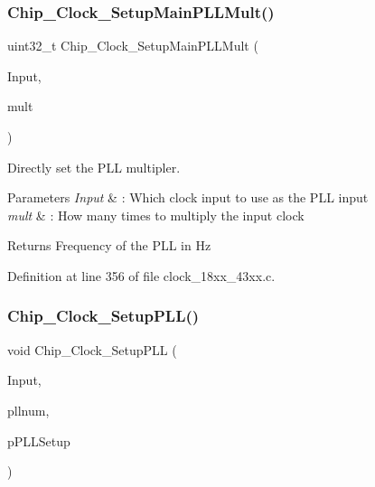 \subsubsection{\texorpdfstring{Chip\+\_\+\+Clock\+\_\+\+Setup\+Main\+P\+L\+L\+Mult()}{Chip\_Clock\_SetupMainPLLMult()}}
{\footnotesize\ttfamily uint32\+\_\+t Chip\+\_\+\+Clock\+\_\+\+Setup\+Main\+P\+L\+L\+Mult (\begin{DoxyParamCaption}\item[{\hyperlink{group___c_l_o_c_k__18_x_x__43_x_x_ga0975326707efebf2b074283e6c602f18}{C\+H\+I\+P\+\_\+\+C\+G\+U\+\_\+\+C\+L\+K\+I\+N\+\_\+T}}]{Input,  }\item[{uint32\+\_\+t}]{mult }\end{DoxyParamCaption})}



Directly set the P\+LL multipler. 


\begin{DoxyParams}{Parameters}
{\em Input} & \+: Which clock input to use as the P\+LL input \\
\hline
{\em mult} & \+: How many times to multiply the input clock \\
\hline
\end{DoxyParams}
\begin{DoxyReturn}{Returns}
Frequency of the P\+LL in Hz 
\end{DoxyReturn}


Definition at line 356 of file clock\+\_\+18xx\+\_\+43xx.\+c.

\mbox{\label{group___c_l_o_c_k__18_x_x__43_x_x_gaed16ed3df8281cb642db7525fdf1493d}} 
\subsubsection{\texorpdfstring{Chip\+\_\+\+Clock\+\_\+\+Setup\+P\+L\+L()}{Chip\_Clock\_SetupPLL()}}
{\footnotesize\ttfamily void Chip\+\_\+\+Clock\+\_\+\+Setup\+P\+LL (\begin{DoxyParamCaption}\item[{\hyperlink{group___c_l_o_c_k__18_x_x__43_x_x_ga0975326707efebf2b074283e6c602f18}{C\+H\+I\+P\+\_\+\+C\+G\+U\+\_\+\+C\+L\+K\+I\+N\+\_\+T}}]{Input,  }\item[{\hyperlink{group___c_l_o_c_k__18_x_x__43_x_x_ga839a458a9e1e2a85e68470156c861e6a}{C\+H\+I\+P\+\_\+\+C\+G\+U\+\_\+\+U\+S\+B\+\_\+\+A\+U\+D\+I\+O\+\_\+\+P\+L\+L\+\_\+T}}]{pllnum,  }\item[{const \hyperlink{struct_c_g_u___u_s_b_a_u_d_i_o___p_l_l___s_e_t_u_p___t}{C\+G\+U\+\_\+\+U\+S\+B\+A\+U\+D\+I\+O\+\_\+\+P\+L\+L\+\_\+\+S\+E\+T\+U\+P\+\_\+T} $\ast$}]{p\+P\+L\+L\+Setup }\end{DoxyParamCaption})}



